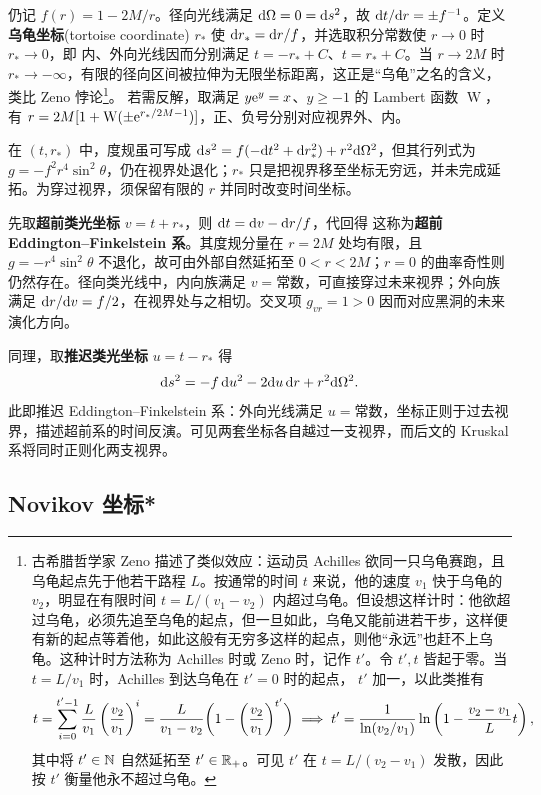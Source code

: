 仍记 $f(r)=1-2M/r$。径向光线满足 $\dd\Omega=0=\dd s^2$，故 $\dd t/\dd r=\pm f^{-1}$。定义\textbf{乌龟坐标}(tortoise coordinate) $r_*$ 使 $\dd r_*=\dd r/f$，并选取积分常数使 $r\to0$ 时 $r_*\to0$，即
内、外向光线因而分别满足 $t=-r_*+C$、$t=r_*+C$。当 $r\to2M$ 时 $r_*\to-\infty$，有限的径向区间被拉伸为无限坐标距离，这正是“乌龟”之名的含义，
类比 Zeno 悖论\footnote{古希腊哲学家 Zeno 描述了类似效应：运动员 Achilles 欲同一只乌龟赛跑，且乌龟起点先于他若干路程 $L$。按通常的时间 $t$ 来说，他的速度 $v_1$ 快于乌龟的 $v_2$，明显在有限时间 $t=L/(v_1-v_2)$ 内超过乌龟。但设想这样计时：他欲超过乌龟，必须先追至乌龟的起点，但一旦如此，乌龟又能前进若干步，这样便有新的起点等着他，如此这般有无穷多这样的起点，则他“永远”也赶不上乌龟。这种计时方法称为 Achilles 时或 Zeno 时，记作 $t'$。令 $t',t$ 皆起于零。当 $t=L/v_1$ 时，Achilles 到达乌龟在 $t'=0$ 时的起点， $t'$ 加一，以此类推有
\[t=\sum_{i=0}^{t'-1} \frac{L}{v_1}\left(\frac{v_2}{v_1}\right)^{i}=\frac{L}{v_1-v_2}\bigg(1-\bigg(\frac{v_2}{v_1}\bigg)^{t'}\bigg)\implies t'=\frac{1}{\ln(v_2/v_1)}\ln\left(1-\frac{v_2-v_1}{L}t\right),\]
其中将 $t'\in\mathbb{N}$ 自然延拓至 $t'\in\mathbb{R}_+$。可见 $t'$ 在 $t=L/(v_2-v_1)$ 发散，因此按 $t'$ 衡量他永不超过乌龟。}。
若需反解，取满足 $y\mathrm{e}^y=x$、$y\geqslant-1$ 的 Lambert 函数 $\operatorname W$，有 $r=2M[1+\operatorname W(\pm\mathrm{e}^{r_*/2M-1})]$，正、负号分别对应视界外、内。

在 $(t,r_*)$ 中，度规虽可写成 $\dd s^2=f(-\dd t^2+\dd r_*^2)+r^2\dd\Omega^2$，但其行列式为 $g=-f^2r^4\sin^2\theta$，仍在视界处退化；$r_*$ 只是把视界移至坐标无穷远，并未完成延拓。为穿过视界，须保留有限的 $r$ 并同时改变时间坐标。

先取\textbf{超前类光坐标} $v=t+r_*$，则 $\dd t=\dd v-\dd r/f$，代回得
这称为\textbf{超前 Eddington--Finkelstein 系}。其度规分量在 $r=2M$ 处均有限，且 $g=-r^4\sin^2\theta$ 不退化，故可由外部自然延拓至 $0<r<2M$；$r=0$ 的曲率奇性则仍然存在。径向类光线中，内向族满足 $v=\text{常数}$，可直接穿过未来视界；外向族满足 $\dd r/\dd v=f/2$，在视界处与之相切。交叉项 $g_{vr}=1>0$ 因而对应黑洞的未来演化方向。

同理，取\textbf{推迟类光坐标} $u=t-r_*$ 得
\[
    \dd s^2=-f\,\dd u^2-2\dd u\,\dd r+r^2\dd\Omega^2.
\]
此即推迟 Eddington--Finkelstein 系：外向光线满足 $u=\text{常数}$，坐标正则于过去视界，描述超前系的时间反演。可见两套坐标各自越过一支视界，而后文的 Kruskal 系将同时正则化两支视界。

\subsection{Novikov 坐标*}

